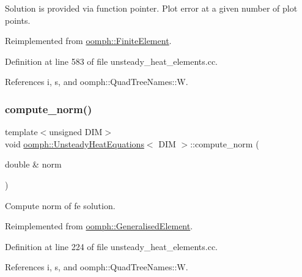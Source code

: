 Solution is provided via function pointer. Plot error at a given number of plot points. 

Reimplemented from \hyperlink{classoomph_1_1FiniteElement_a7f67853506dc73fa6b7505108de22d1f}{oomph\+::\+Finite\+Element}.



Definition at line 583 of file unsteady\+\_\+heat\+\_\+elements.\+cc.



References i, s, and oomph\+::\+Quad\+Tree\+Names\+::W.

\mbox{\label{classoomph_1_1UnsteadyHeatEquations_a0b5413cd78f410efd7ab3273a34cca5f}} 
\subsubsection{\texorpdfstring{compute\+\_\+norm()}{compute\_norm()}}
{\footnotesize\ttfamily template$<$unsigned D\+IM$>$ \\
void \hyperlink{classoomph_1_1UnsteadyHeatEquations}{oomph\+::\+Unsteady\+Heat\+Equations}$<$ D\+IM $>$\+::compute\+\_\+norm (\begin{DoxyParamCaption}\item[{double \&}]{norm }\end{DoxyParamCaption})\hspace{0.3cm}{\ttfamily [virtual]}}



Compute norm of fe solution. 



Reimplemented from \hyperlink{classoomph_1_1GeneralisedElement_af2025a472df6752a946739da58e7fb37}{oomph\+::\+Generalised\+Element}.



Definition at line 224 of file unsteady\+\_\+heat\+\_\+elements.\+cc.



References i, s, and oomph\+::\+Quad\+Tree\+Names\+::W.

\mbox{\label{classoomph_1_1UnsteadyHeatEquations_a25113368ba4d7b4b054ca4a046fe9ff7}} 
